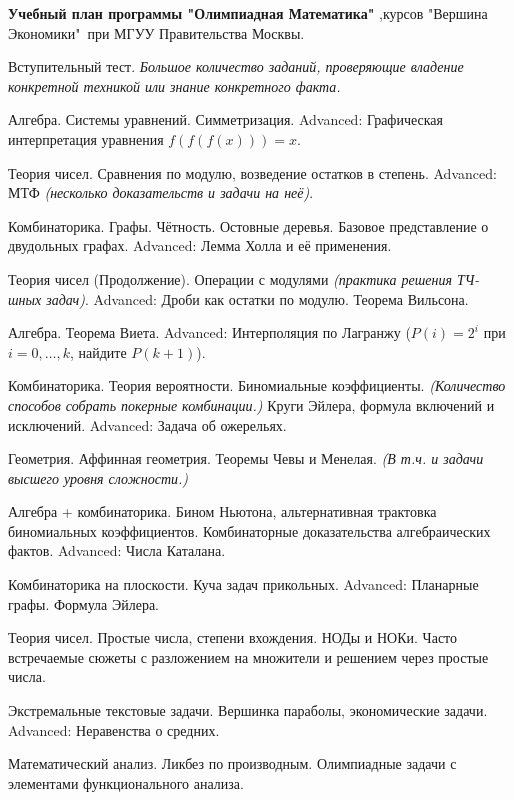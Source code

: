 \documentclass[12pt, a4paper]{article}
\begin{document}
\begin{center}
\textbf{
	Учебный план программы "Олимпиадная Математика"
	}
, курсов "Вершина Экономики"\ при МГУУ Правительства Москвы.
\end{center}

\setcounter{iii}{0}

\ii Вступительный тест. \textit{Большое количество заданий, проверяющие владение конкретной техникой или знание конкретного факта.}

\ii Алгебра. Системы уравнений. Симметризация. Advanced: Графическая интерпретация уравнения $f(f(f(x)))=x$.

\ii Теория чисел. Сравнения по модулю, возведение остатков в степень. Advanced: МТФ \textit{(несколько доказательств и задачи на неё)}.

\ii Комбинаторика. Графы. Чётность. Остовные деревья. Базовое представление о двудольных графах. Advanced: Лемма Холла и её применения.

\ii Теория чисел (Продолжение). Операции с модулями \textit{(практика решения ТЧ-шных задач)}. Advanced: Дроби как остатки по модулю. Теорема Вильсона.

\ii Алгебра. Теорема Виета. Advanced: Интерполяция по Лагранжу ($P(i)=2^i$ при $i=0,\dots,k$, найдите $P(k+1)$).

\ii Комбинаторика. Теория вероятности. Биномиальные коэффициенты. \textit{(Количество способов собрать покерные комбинации.)} Круги Эйлера, формула включений и исключений. Advanced: Задача об ожерельях.

\ii Геометрия. Аффинная геометрия. Теоремы Чевы и Менелая. \textit{(В т.ч. и задачи высшего уровня сложности.)}

\ii Алгебра + комбинаторика. Бином Ньютона, альтернативная трактовка биномиальных коэффициентов. Комбинаторные доказательства алгебраических фактов. Advanced: Числа Каталана.

\ii Комбинаторика на плоскости. Куча задач прикольных. Advanced: Планарные графы. Формула Эйлера.

\ii Теория чисел. Простые числа, степени вхождения. НОДы и НОКи. Часто встречаемые сюжеты с разложением на множители и решением через простые числа.

\ii Экстремальные текстовые задачи. Вершинка параболы, экономические задачи. Advanced: Неравенства о средних.

\ii Математический анализ. Ликбез по производным. Олимпиадные задачи с элементами функционального анализа.
\end{document}
